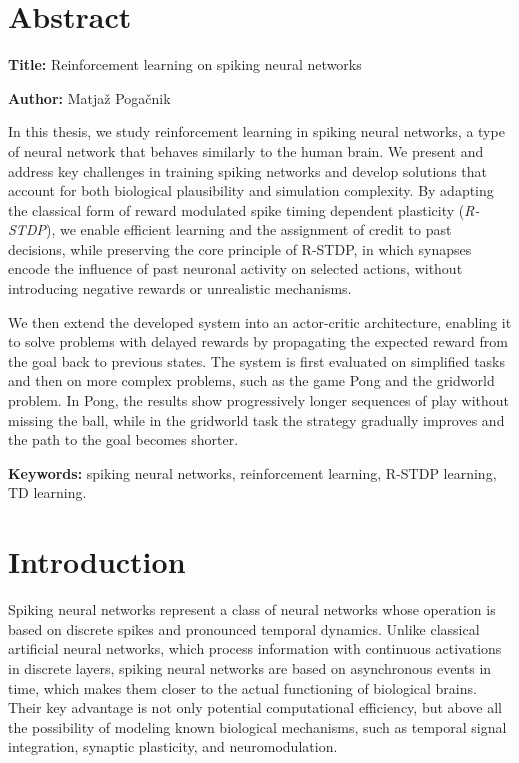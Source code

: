 \documentclass[a4paper,12pt,openright]{book}
\newcommand{\ttitleEn}{Reinforcement learning on spiking neural networks}
\newcommand{\tauthor}{Matjaž Pogačnik}
\newcommand{\tkeywordsEn}{spiking neural networks, reinforcement learning, R-STDP learning, TD learning}
\newcommand{\clearemptydoublepage}{\newpage{\pagestyle{empty}\cleardoublepage}}
\begin{document}
\clearemptydoublepage

\chapter*{Abstract}

\noindent\textbf{Title:} \ttitleEn
\bigskip

\noindent\textbf{Author:} \tauthor
\bigskip

\noindent %
In this thesis, we study reinforcement learning in spiking neural networks, a type of neural network that behaves similarly to the human brain. We present and address key challenges in training spiking networks and develop solutions that account for both biological plausibility and simulation complexity. By adapting the classical form of reward modulated spike timing dependent plasticity (\textit{R-STDP}), we enable efficient learning and the assignment of credit to past decisions, while preserving the core principle of R-STDP, in which synapses encode the influence of past neuronal activity on selected actions, without introducing negative rewards or unrealistic mechanisms.

We then extend the developed system into an actor-critic architecture, enabling it to solve problems with delayed rewards by propagating the expected reward from the goal back to previous states. The system is first evaluated on simplified tasks and then on more complex problems, such as the game Pong and the gridworld problem. In Pong, the results show progressively longer sequences of play without missing the ball, while in the gridworld task the strategy gradually improves and the path to the goal becomes shorter.
\bigskip

\noindent\textbf{Keywords:} \tkeywordsEn.
\clearemptydoublepage

\mainmatter
\setcounter{page}{1}
\pagestyle{fancy}

\chapter{Introduction}
\label{intro}
Spiking neural networks represent a class of neural networks whose operation is based on discrete spikes and pronounced temporal dynamics. Unlike classical artificial neural networks, which process information with continuous activations in discrete layers, spiking neural networks are based on asynchronous events in time, which makes them closer to the actual functioning of biological brains. Their key advantage is not only potential computational efficiency, but above all the possibility of modeling known biological mechanisms, such as temporal signal integration, synaptic plasticity, and neuromodulation.
\end{document}
